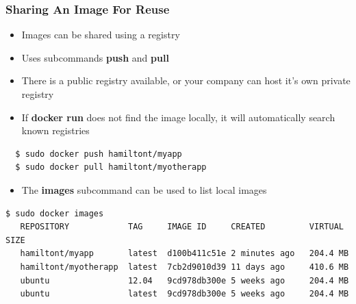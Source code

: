 \documentclass[xcolor=dvipsnames]{beamer}
\begin{document}
\begin{frame}[fragile]
  \frametitle{Sharing An Image For Reuse}

  \begin{itemize}
    \item Images can be shared using a registry

    \item Uses subcommands \textbf{push} and \textbf{pull}

    \item There is a public registry available, or your company can host it's 
    own private registry

    \item If \textbf{docker run} does not find the image locally, it will 
    automatically search known registries
    
  \end{itemize}

  \begin{lstlisting}
  $ sudo docker push hamiltont/myapp
  $ sudo docker pull hamiltont/myotherapp
  \end{lstlisting}

  \begin{itemize}
    \item The \textbf{images} subcommand can be used to list local images
  \end{itemize}
  
  \begin{lstlisting}[basicstyle=\tiny]
   $ sudo docker images
   REPOSITORY            TAG     IMAGE ID     CREATED         VIRTUAL SIZE
   hamiltont/myapp       latest  d100b411c51e 2 minutes ago   204.4 MB
   hamiltont/myotherapp  latest  7cb2d9010d39 11 days ago     410.6 MB
   ubuntu                12.04   9cd978db300e 5 weeks ago     204.4 MB
   ubuntu                latest  9cd978db300e 5 weeks ago     204.4 MB
  \end{lstlisting}

\end{frame}
\end{document}
